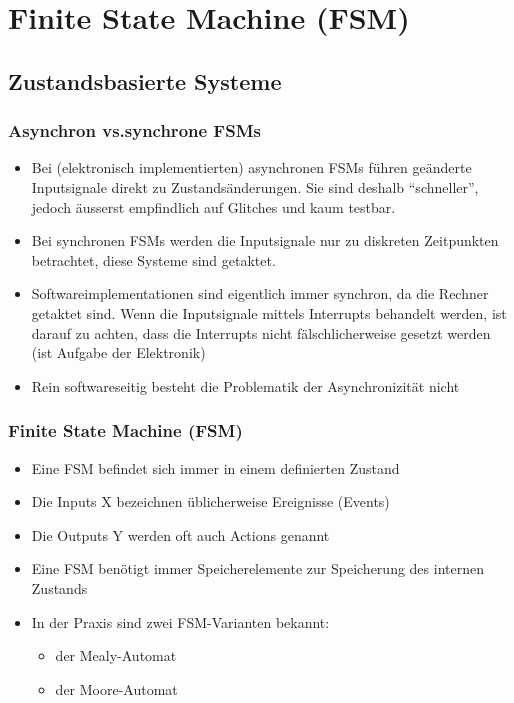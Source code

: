 \section{Finite State Machine (FSM)}

\subsection{Zustandsbasierte Systeme}

\subsubsection{Asynchron vs.synchrone FSMs}
\begin{itemize}
  \item Bei (elektronisch implementierten) asynchronen FSMs führen geänderte
  Inputsignale direkt zu Zustandsänderungen. Sie sind deshalb "`schneller"',
  jedoch äusserst empfindlich auf Glitches und kaum testbar.
  \item Bei synchronen FSMs werden die Inputsignale nur zu diskreten Zeitpunkten
  betrachtet, diese Systeme sind getaktet.
  \item Softwareimplementationen sind eigentlich immer synchron, da die Rechner
  getaktet sind. Wenn die Inputsignale mittels Interrupts behandelt werden, ist
  darauf zu achten, dass die Interrupts nicht fälschlicherweise gesetzt werden (ist Aufgabe der Elektronik)
  \item Rein softwareseitig besteht die Problematik der Asynchronizität nicht
\end{itemize}

\subsubsection{Finite State Machine (FSM)}
\begin{itemize}
  \item Eine FSM befindet sich immer in einem definierten Zustand
  \item Die Inputs X bezeichnen üblicherweise Ereignisse (Events)
  \item Die Outputs Y werden oft auch Actions genannt
  \item Eine FSM benötigt immer Speicherelemente zur Speicherung des internen Zustands
  \item In der Praxis sind zwei FSM-Varianten bekannt: \begin{itemize}
			\item der Mealy-Automat
			\item der Moore-Automat
  			\end{itemize}
\end{itemize}
  
